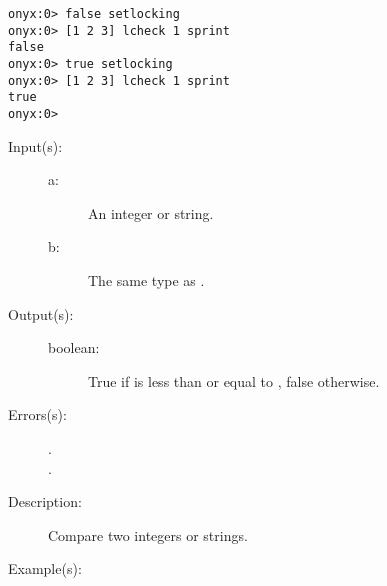 \begin{description}
\begin{description}
\begin{verbatim}
onyx:0> false setlocking
onyx:0> [1 2 3] lcheck 1 sprint
false
onyx:0> true setlocking
onyx:0> [1 2 3] lcheck 1 sprint
true
onyx:0>
		\end{verbatim}
	\end{description}
\label{systemdict:le}
\item[{\onyxop{a b}{le}{boolean}}: ]
	\begin{description}\item[]
	\item[Input(s): ]
		\begin{description}\item[]
		\item[a: ]
			An integer or string.
		\item[b: ]
			The same type as .
		\end{description}
	\item[Output(s): ]
		\begin{description}\item[]
		\item[boolean: ]
			True if  is less than or equal to ,
			false otherwise.
		\end{description}
	\item[Errors(s): ]
		\begin{description}\item[]
		\item[.]
		\item[.]
		\end{description}
	\item[Description: ]
		Compare two integers or strings.
	\item[Example(s): ]\begin{verbatim}


\end{verbatim}
\end{description}
\end{description}
